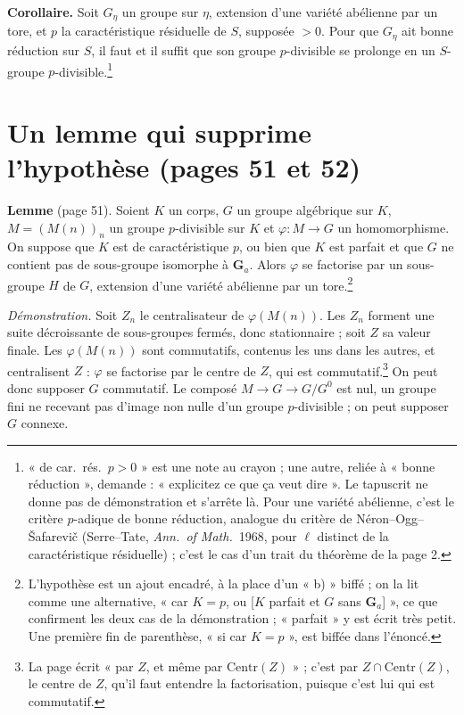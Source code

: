 \documentclass[11pt,a4paper]{article}
\begin{document}
\textbf{Corollaire.} Soit $G_\eta$ un groupe sur $\eta$, extension d'une
variété abélienne par un tore, et $p$ la caractéristique résiduelle de $S$,
supposée $> 0$. Pour que $G_\eta$ ait bonne réduction sur $S$, il faut et il
suffit que son groupe $p$-divisible se prolonge en un $S$-groupe
$p$-divisible.\footnote{« de car.\ rés.\ $p > 0$ » est une note au crayon ;
une autre, reliée à « bonne réduction », demande : « explicitez ce que ça veut
dire ». Le tapuscrit ne donne pas de démonstration et s'arrête là. Pour une
variété abélienne, c'est le critère $p$-adique de bonne réduction, analogue du
critère de Néron--Ogg--Šafarevič (Serre--Tate, \emph{Ann.\ of Math.}\ 1968,
pour $\ell$ distinct de la caractéristique résiduelle) ; c'est le cas d'un
trait du théorème de la page 2.}

\section*{Un lemme qui supprime l'hypothèse (pages 51 et 52)}

\textbf{Lemme} (page 51). Soient $K$ un corps, $G$ un groupe algébrique sur
$K$, $M = (M(n))_n$ un groupe $p$-divisible sur $K$ et $\varphi : M \to G$ un
homomorphisme. On suppose que $K$ est de caractéristique $p$, ou bien que $K$
est parfait et que $G$ ne contient pas de sous-groupe isomorphe à
$\mathbf{G}_a$. Alors $\varphi$ se factorise par un sous-groupe $H$ de $G$,
extension d'une variété abélienne par un tore.\footnote{L'hypothèse est un ajout
encadré, à la place d'un « b) » biffé ; on la lit comme une alternative,
« car $K = p$, ou [$K$ parfait et $G$ sans $\mathbf{G}_a$] », ce que
confirment les deux cas de la démonstration ; « parfait » y est écrit très
petit. Une première fin de parenthèse, « si car $K = p$ », est biffée dans
l'énoncé.}

\emph{Démonstration.} Soit $Z_n$ le centralisateur de $\varphi(M(n))$. Les
$Z_n$ forment une suite décroissante de sous-groupes fermés, donc
stationnaire ; soit $Z$ sa valeur finale. Les $\varphi(M(n))$ sont
commutatifs, contenus les uns dans les autres, et centralisent $Z$ : $\varphi$
se factorise par le centre de $Z$, qui est commutatif.\footnote{La page écrit
« par $Z$, et même par $\mathrm{Centr}(Z)$ » ; c'est par
$Z \cap \mathrm{Centr}(Z)$, le centre de $Z$, qu'il faut entendre la
factorisation, puisque c'est lui qui est commutatif.} On peut donc supposer
$G$ commutatif. Le composé $M \to G \to G/G^0$ est nul, un groupe fini ne
recevant pas d'image non nulle d'un groupe $p$-divisible ; on peut supposer
$G$ connexe.
\end{document}
